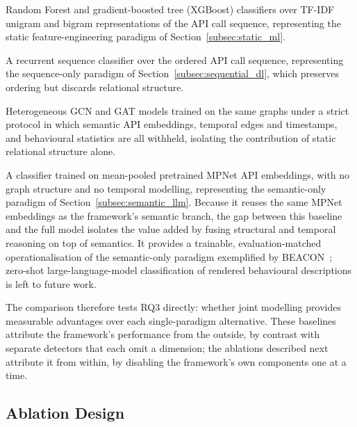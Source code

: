 \documentclass[%
    BCOR=10mm,
    DIV=13,
    toc=bibliography,
    toc=listof,
    oneside,
    12pt,
]{scrbook}
\begin{document}
\begin{description}[leftmargin=0pt, labelwidth=0pt, labelsep=\parskip, style=nextline]

\item[\textbf{Classical machine learning.}] Random Forest and gradient-boosted
tree (XGBoost) classifiers over TF-IDF unigram and bigram representations of
the API call sequence, representing the static
feature-engineering paradigm of Section~\ref{subsec:static_ml}.

\item[\textbf{Sequential deep learning.}] A recurrent sequence classifier over
the ordered API call sequence, representing the sequence-only paradigm of
Section~\ref{subsec:sequential_dl}, which preserves ordering but discards
relational structure.

\item[\textbf{Static graph neural networks.}] Heterogeneous GCN and GAT
models trained on the same graphs under a strict protocol in which semantic
API embeddings, temporal edges and timestamps, and behavioural statistics are
all withheld, isolating the contribution of static relational structure alone.

\item[\textbf{Semantic-embedding classification.}] A classifier trained on
mean-pooled pretrained MPNet API embeddings, with no graph structure and no
temporal modelling, representing the semantic-only paradigm of
Section~\ref{subsec:semantic_llm}. Because it reuses the same MPNet embeddings
as the framework's semantic branch, the gap between this baseline and the full
model isolates the value added by fusing structural and temporal reasoning on
top of semantics. It provides a trainable, evaluation-matched operationalisation
of the semantic-only paradigm exemplified by BEACON~\cite{perera2023beacon};
zero-shot large-language-model classification of rendered behavioural
descriptions is left to future work.

\end{description}

The comparison therefore tests RQ3 directly: whether joint modelling provides
measurable advantages over each single-paradigm alternative. These baselines
attribute the framework's performance from the outside, by contrast with
separate detectors that each omit a dimension; the ablations described next
attribute it from within, by disabling the framework's own components one at a
time.

\subsection{Ablation Design}
\label{subsec:ablations}
\end{document}
